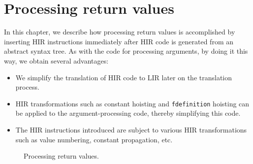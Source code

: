 \chapter{Processing return values}

In this chapter, we describe how processing return values is
accomplished by inserting HIR instructions immediately after HIR code
is generated from an abstract syntax tree.  As with the code for
processing arguments, by doing it this way, we obtain several
advantages:

\begin{itemize}
\item We simplify the translation of HIR code to LIR later on the
  translation process.
\item HIR transformations such as constant hoisting and
  \texttt{fdefinition} hoisting can be applied to the
  argument-processing code, thereby simplifying this code.
\item The HIR instructions introduced are subject to various HIR
  transformations such as value numbering, constant propagation,
  etc.
\end{itemize}

\begin{figure}
\begin{center}
\end{center}
\caption{\label{fig-process-values}
Processing return values.}
\end{figure}
